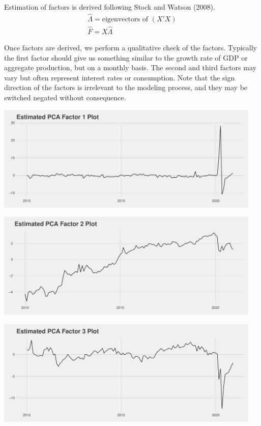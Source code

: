 \documentclass[11pt, letterpaper]{article}\usepackage[]{graphicx}\usepackage[]{color}
\begin{document}
Estimation of factors is derived following Stock and Watson (2008).
\begin{align*}
	\widehat{\Lambda} = \text{eigenvectors of } (X'X)\\
	\widehat{F} = X \widehat{\Lambda}
\end{align*}

Once factors are derived, we perform a qualitative check of the factors. Typically the first factor should give us something similar to the growth rate of GDP or aggregate production, but on a monthly basis. The second and third factors may vary but often represent interest rates or consumption. Note that the sign direction of the factors is irrelevant to the modeling process, and they may be switched negated without consequence. 



{\centering \includegraphics[width=5in,height=2in]{figure/unnamed-chunk-4-1} 

}




{\centering \includegraphics[width=5in,height=2in]{figure/unnamed-chunk-4-2} 

}




{\centering \includegraphics[width=5in,height=2in]{figure/unnamed-chunk-4-3} 

}
\end{document}
